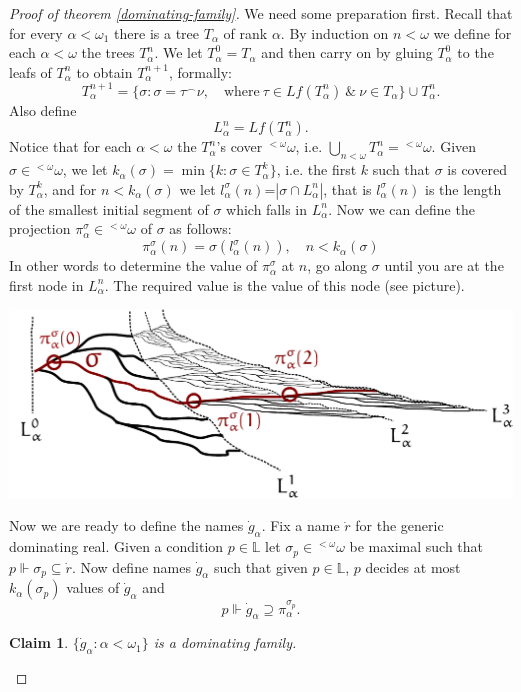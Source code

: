 \documentclass[a4paper,11pt,oneside]{mybook}
\def\force{\Vdash}
\def\conc{{^\smallfrown}}
\theoremstyle{theorem}
\newtheorem{claim}[subsection]{Claim}
\theoremstyle{example}
\begin{document}
\begin{proof}[Proof of theorem \ref{dominating-family}]
We need some preparation first. Recall that for every $\alpha<\omega_1$ there is a tree $T_\alpha$ of rank $\alpha$. By induction on $n<\omega$ we define for each $\alpha<\omega$ the trees $T_\alpha^n$. We let $T_\alpha^0=T_\alpha$ and then carry on by gluing $T_\alpha^0$ to the leafs of $T_\alpha^n$ to obtain $T_\alpha^{n+1}$, formally:
$$
T_\alpha^{n+1}=\{\sigma:\sigma=\tau\conc\nu,\quad\mbox{where}\ \tau\in Lf(T_\alpha^n)\ \&\ \nu\in T_\alpha\}\cup T_\alpha^n.
$$
Also define
$$
L_\alpha^n=Lf(T_\alpha^n).
$$
Notice that for each $\alpha<\omega$ the $T_\alpha^n$'s cover ${}^{<\omega}\omega$, i.e. $\bigcup_{n<\omega}T_\alpha^n={}^{<\omega}\omega$.
Given $\sigma\in{}^{<\omega}\omega$, we let $k_\alpha(\sigma)=\min\{k:\sigma\in T_\alpha^k\}$, i.e. the first $k$ such that $\sigma$ is covered by $T_\alpha^k$, and for $n<k_\alpha(\sigma)$ we let $l_\alpha^\sigma(n)$=$|\sigma\cap L_\alpha^n|$, that is $l_\alpha^\sigma(n)$ is the length of the smallest initial segment of $\sigma$ which falls in $L_\alpha^n$. Now we can define the projection $\pi_\alpha^\sigma\in{}^{<\omega}\omega$ of $\sigma$ as follows:
$$
\pi_\alpha^\sigma(n)=\sigma(l_\alpha^\sigma(n)),\quad n<k_\alpha(\sigma)
$$
In other words to determine the value of $\pi_\alpha^\sigma$ at $n$, go along $\sigma$ until you are at the first node in $L_\alpha^n$. The required value
is the value of this node (see picture).
\vskip5mm
\centerline{\includegraphics[scale=0.40]{laver-picture.pdf}}

Now we are ready to define the names $\dot{g}_\alpha$. Fix a name $\dot{r}$ for the generic dominating real. Given a condition $p\in\mathbb{L}$ let $\sigma_p\in{}^{<\omega}\omega$ be maximal such that $p\force\sigma_p\subseteq\dot{r}$.
Now define names $\dot{g}_\alpha$ such that given $p\in\mathbb{L}$, $p$ decides at most $k_\alpha(\sigma_p)$ values of $\dot{g}_\alpha$ and
$$
p\force \dot{g}_\alpha\supseteq \pi_\alpha^{\sigma_p}.
$$

\begin{claim} $\{\dot{g}_\alpha:\alpha<\omega_1\}$ is a dominating family.
\end{claim}


\end{proof}
\end{document}
